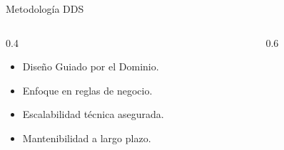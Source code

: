 \documentclass[aspectratio=169]{beamer}
\begin{document}
\begin{frame}{Metodología DDS}
    \begin{columns}[T]
        \begin{column}{0.4\textwidth}
            \vspace{1cm}
            \begin{itemize}
                \item Diseño Guiado por el Dominio.
                \item Enfoque en reglas de negocio.
                \item Escalabilidad técnica asegurada.
                \item Mantenibilidad a largo plazo.
            \end{itemize}
        \end{column}
        \begin{column}{0.6\textwidth}
            \centering
        \end{column}
    \end{columns}
\end{frame}
\end{document}
